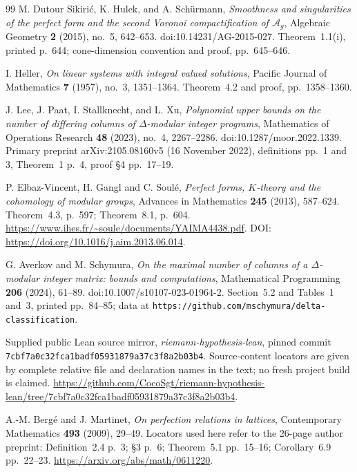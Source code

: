 \documentclass[11pt,a4paper]{article}
\theoremstyle{definition}
\begin{document}
\begin{thebibliography}{99}
M. Dutour Sikiri\'c, K. Hulek, and A. Sch\"urmann,
\emph{Smoothness and singularities of the perfect form and the second
Voronoi compactification of $\mathcal A_g$},
Algebraic Geometry \textbf{2} (2015), no.~5, 642--653.
doi:10.14231/AG-2015-027.
Theorem~1.1(i), printed p.~644; cone-dimension convention and proof,
pp.~645--646.


I. Heller, \emph{On linear systems with integral valued solutions},
Pacific Journal of Mathematics \textbf{7} (1957), no.~3, 1351--1364.
Theorem~4.2 and proof, pp.~1358--1360.


J. Lee, J. Paat, I. Stallknecht, and L. Xu,
\emph{Polynomial upper bounds on the number of differing columns of
$\Delta$-modular integer programs},
Mathematics of Operations Research \textbf{48} (2023), no.~4, 2267--2286.
doi:10.1287/moor.2022.1339.
Primary preprint arXiv:2105.08160v5 (16 November 2022),
definitions pp.~1 and 3, Theorem~1 p.~4, proof \S4 pp.~17--19.

P. Elbaz-Vincent, H. Gangl and C. Soul\'e,
\emph{Perfect forms, $K$-theory and the cohomology of modular groups},
Advances in Mathematics \textbf{245} (2013), 587--624.
Theorem~4.3, p.~597; Theorem~8.1, p.~604.
\url{https://www.ihes.fr/~soule/documents/YAIMA4438.pdf}.
DOI: \url{https://doi.org/10.1016/j.aim.2013.06.014}.

G. Averkov and M. Schymura,
\emph{On the maximal number of columns of a $\Delta$-modular integer
matrix: bounds and computations},
Mathematical Programming \textbf{206} (2024), 61--89.
doi:10.1007/s10107-023-01964-2.
Section~5.2 and Tables~1 and~3, printed pp.~84--85;
data at \texttt{https://github.com/mschymura/delta-classification}.

Supplied public Lean source mirror,
\emph{riemann-hypothesis-lean},
pinned commit
\texttt{7cbf7a0c32fca1badf05931879a37c3f8a2b03b4}.
Source-content locators are given by complete relative file and
declaration names in the text; no fresh project build is claimed.
\url{https://github.com/CocoSgt/riemann-hypothesis-lean/tree/7cbf7a0c32fca1badf05931879a37c3f8a2b03b4}.

A.-M. Berg\'e and J. Martinet,
\emph{On perfection relations in lattices},
Contemporary Mathematics \textbf{493} (2009), 29--49.
Locators used here refer to the 26-page author preprint:
Definition~2.4 p.~3; \S3 p.~6; Theorem~5.1 pp.~15--16;
Corollary~6.9 pp.~22--23.
\url{https://arxiv.org/abs/math/0611220}.



\end{thebibliography}
\end{document}
